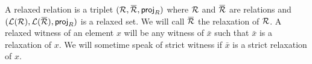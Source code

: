 	A relaxed relation is a triplet $(\relation,\barrelation, \proj_R)$ where 
	$\mathcal{R}$ and $\barrelation$ are relations and
	$(\Language{\relation},\Language{\barrelation}, \proj_R)$ is a relaxed set.
	We will call $\barrelation$ the relaxation of $\mathcal{R}$.
	A relaxed witness of an element $x$ will be any witness of $\bar{x}$ such that
	$\bar{x}$ is a relaxation of $x$. We will sometime speak of strict witness if $\bar{x}$
	is a strict relaxation of $x$.








\iffalse
    \begin{verbatim}
        _.~"(_.~"(_.~"(_.~"(_.~"(

Enfin juste la partie initiale definissant les AC,
le reste dans une annexe qui va sauter (pour l'avoir sous la main).

Ajouter l'annexe E, mais juste un blabla dans le corps, 
les figures dans une annexe qui va sauter. 
   
Olivier: J'ai juste mis le fichier initial, le ajouter mais non 
mais si c'est pas clair :p

\end{verbatim}
\fi

